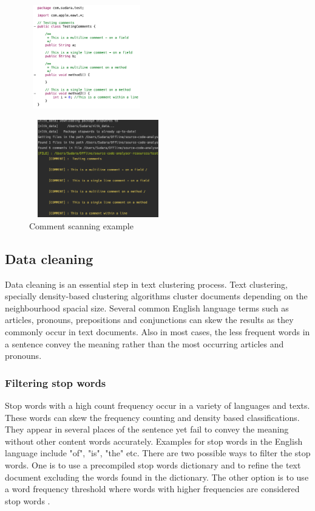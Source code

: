 \documentclass[conference]{IEEEtran}
\begin{document}
\begin{figure}[!h]
\centerline{\includegraphics[width=5cm, height=4.5cm]{graphics/java-program.png}}
\label{fig}
\end{figure}
\begin{figure}[!h]
\centerline{\includegraphics[width=6cm, height=4.25cm]{graphics/comment-result.png}}
\caption{Comment scanning example}
\label{fig}
\end{figure}

\subsection{Data cleaning}

Data cleaning is an essential step in text clustering process. Text clustering, specially density-based clustering algorithms cluster documents depending on the neighbourhood spacial size. Several common English language terms such as articles, pronouns, prepositions and conjunctions can skew the results as they commonly occur in text documents. Also in most cases, the less frequent words in a sentence convey the meaning rather than the most occurring articles and pronouns. 

\subsubsection{Filtering stop words}

Stop words with a high count frequency occur in a variety of languages and texts. These words can skew the frequency counting and density based classifications. They appear in several places of the sentence yet fail to convey the meaning without other content words accurately. Examples for stop words in the English language include "of", "is", "the" etc. There are two possible ways to filter the stop words. One is to use a precompiled stop words dictionary and to refine the text document excluding the words found in the dictionary. The other option is to use a word frequency threshold where words with higher frequencies are considered stop words \cite{5635068}. 
\end{document}
